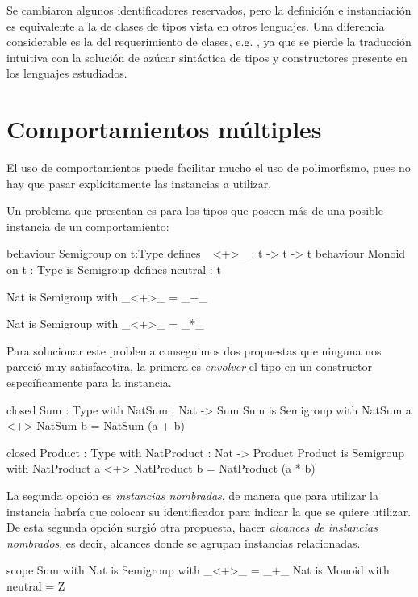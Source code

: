 {\begin{designfr}
Se cambiaron algunos identificadores reservados, pero la definición e instanciación es equivalente a la de clases de tipos vista en otros lenguajes. Una diferencia considerable es la del requerimiento de clases, e.g. , ya que se pierde la traducción intuitiva con la solución de azúcar sintáctica de tipos y constructores presente en los lenguajes estudiados.
\end{designfr}

\section{Comportamientos múltiples}

\begin{designfr}
El uso de comportamientos puede facilitar mucho el uso de polimorfismo, pues no hay que pasar explícitamente las instancias a utilizar.

Un problema que presentan es para los tipos que poseen más de una posible instancia de un comportamiento:

\begin{anglercode}
behaviour Semigroup on t:Type defines
    _<+>_ : t -> t -> t
behaviour Monoid on t : Type is Semigroup defines
    neutral : t

Nat is Semigroup with
    _<+>_ = _+_

Nat is Semigroup with
    _<+>_ = _*_
\end{anglercode}

Para solucionar este problema conseguimos dos propuestas que ninguna nos pareció muy satisfacotira, la primera es \emph{envolver} el tipo en un constructor específicamente para la instancia.

\begin{anglercode}
closed Sum : Type with
    NatSum : Nat -> Sum
Sum is Semigroup with
    NatSum a <+> NatSum b = NatSum (a + b)

closed Product : Type with
    NatProduct : Nat -> Product
Product is Semigroup with
    NatProduct a <+> NatProduct b = NatProduct (a * b)
\end{anglercode}

La segunda opción es \emph{instancias nombradas}, de manera que para utilizar la instancia habría que colocar su identificador para indicar la que se quiere utilizar. De esta segunda opción surgió otra propuesta, hacer \emph{alcances de instancias nombrados}, es decir, alcances donde se agrupan instancias relacionadas.

\begin{anglercode}
scope Sum with
    Nat is Semigroup with
        _<+>_ = _+_
    Nat is Monoid with
        neutral = Z


\end{anglercode}
\end{designfr}}

